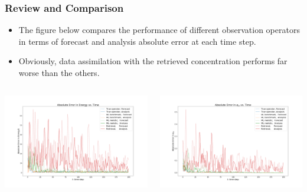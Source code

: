 \documentclass{beamer}
\begin{document}
\begin{frame}
\frametitle{Review and Comparison}
\begin{itemize}
\item The figure below compares the performance of different observation operators in terms of forecast and analysis absolute error at each time step.
\item Obviously, data assimilation with the retrieved concentration performs far worse than the others.
\end{itemize} 
\begin{columns}
\begin{column}{0.5\linewidth}
\centering
\includegraphics[width=\linewidth]{Figures/AbsoluteError_E.png}
\end{column}
\begin{column}{0.5\linewidth}
\centering
\includegraphics[width=\linewidth]{Figures/AbsoluteError_am.png}
\end{column}
\end{columns}
\end{frame}
\end{document}
